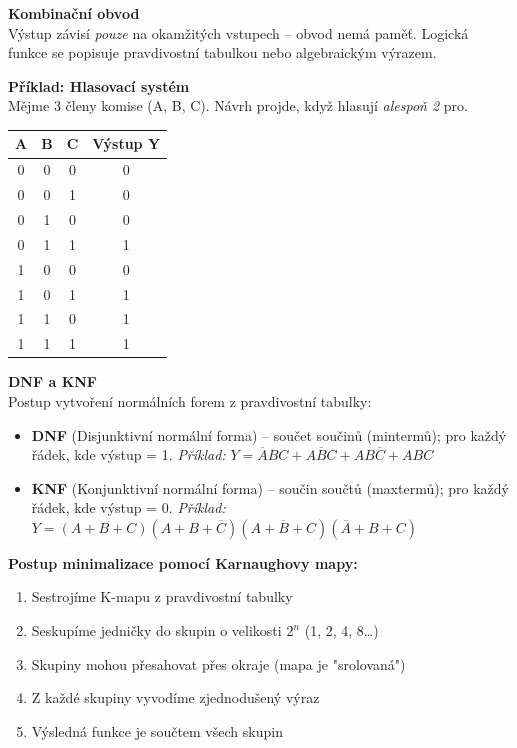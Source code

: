 \documentclass[a4paper,10pt]{article}
\begin{document}
\begin{vysvetlenibox}
\textbf{Kombinační obvod}\\
Výstup závisí \textit{pouze} na okamžitých vstupech -- obvod nemá paměť.
Logická funkce se popisuje pravdivostní tabulkou nebo algebraickým výrazem.

\textbf{Příklad: Hlasovací systém}\\
Mějme 3 členy komise (A, B, C). Návrh projde, když hlasují \textit{alespoň 2} pro.
\begin{center}
\begin{tabular}{ccc|c}
    \toprule
    A & B & C & Výstup Y \\
    \midrule
    0 & 0 & 0 & 0 \\
    0 & 0 & 1 & 0 \\
    0 & 1 & 0 & 0 \\
    0 & 1 & 1 & 1 \\
    1 & 0 & 0 & 0 \\
    1 & 0 & 1 & 1 \\
    1 & 1 & 0 & 1 \\
    1 & 1 & 1 & 1 \\
    \bottomrule
\end{tabular}
\end{center}

\textbf{DNF a KNF}\\
Postup vytvoření normálních forem z pravdivostní tabulky:
\begin{itemize}[noitemsep, leftmargin=1.4em, topsep=4pt]
    \item \textbf{DNF} (Disjunktivní normální forma) -- součet součinů
          (mintermů); pro každý řádek, kde výstup = 1.
          \textit{Příklad:} $Y = \overline{A}BC + A\overline{B}C + AB\overline{C} + ABC$
    \item \textbf{KNF} (Konjunktivní normální forma) -- součin součtů
          (maxtermů); pro každý řádek, kde výstup = 0.
          \textit{Příklad:} $Y = (A+B+C)(A+B+\overline{C})(A+\overline{B}+C)(\overline{A}+B+C)$
\end{itemize}

\textbf{Postup minimalizace pomocí Karnaughovy mapy:}
\begin{enumerate}[noitemsep, leftmargin=1.4em, topsep=4pt]
    \item Sestrojíme K-mapu z pravdivostní tabulky
    \item Seskupíme jedničky do skupin o velikosti $2^n$ (1, 2, 4, 8\ldots)
    \item Skupiny mohou přesahovat přes okraje (mapa je "srolovaná")
    \item Z každé skupiny vyvodíme zjednodušený výraz
    \item Výsledná funkce je součtem všech skupin
\end{enumerate}


\end{vysvetlenibox}
\end{document}
